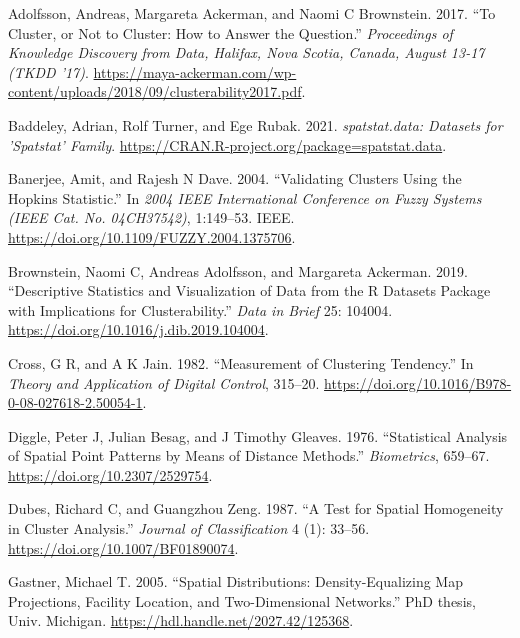 \hypertarget{refs}{}
\begin{CSLReferences}{1}{0}
\leavevmode{}%
Adolfsson, Andreas, Margareta Ackerman, and Naomi C Brownstein. 2017. {``To Cluster, or Not to Cluster: How to Answer the Question.''} \emph{Proceedings of Knowledge Discovery from Data, Halifax, Nova Scotia, Canada, August 13-17 (TKDD '17)}. \url{https://maya-ackerman.com/wp-content/uploads/2018/09/clusterability2017.pdf}.

\leavevmode{}%
Baddeley, Adrian, Rolf Turner, and Ege Rubak. 2021. \emph{{spatstat.data}: Datasets for 'Spatstat' Family}. \url{https://CRAN.R-project.org/package=spatstat.data}.

\leavevmode{}%
Banerjee, Amit, and Rajesh N Dave. 2004. {``Validating Clusters Using the {Hopkins} Statistic.''} In \emph{2004 IEEE International Conference on Fuzzy Systems (IEEE Cat. No. 04CH37542)}, 1:149--53. IEEE. \url{https://doi.org/10.1109/FUZZY.2004.1375706}.

\leavevmode{}%
Brownstein, Naomi C, Andreas Adolfsson, and Margareta Ackerman. 2019. {``Descriptive Statistics and Visualization of Data from the {R} Datasets Package with Implications for Clusterability.''} \emph{Data in Brief} 25: 104004. \url{https://doi.org/10.1016/j.dib.2019.104004}.

\leavevmode{}%
Cross, G R, and A K Jain. 1982. {``Measurement of Clustering Tendency.''} In \emph{Theory and Application of Digital Control}, 315--20. \url{https://doi.org/10.1016/B978-0-08-027618-2.50054-1}.

\leavevmode{}%
Diggle, Peter J, Julian Besag, and J Timothy Gleaves. 1976. {``Statistical Analysis of Spatial Point Patterns by Means of Distance Methods.''} \emph{Biometrics}, 659--67. \url{https://doi.org/10.2307/2529754}.

\leavevmode{}%
Dubes, Richard C, and Guangzhou Zeng. 1987. {``A Test for Spatial Homogeneity in Cluster Analysis.''} \emph{Journal of Classification} 4 (1): 33--56. \url{https://doi.org/10.1007/BF01890074}.

\leavevmode{}%
Gastner, Michael T. 2005. {``Spatial Distributions: Density-Equalizing Map Projections, Facility Location, and Two-Dimensional Networks.''} PhD thesis, Univ. Michigan. \url{https://hdl.handle.net/2027.42/125368}.


\end{CSLReferences}

